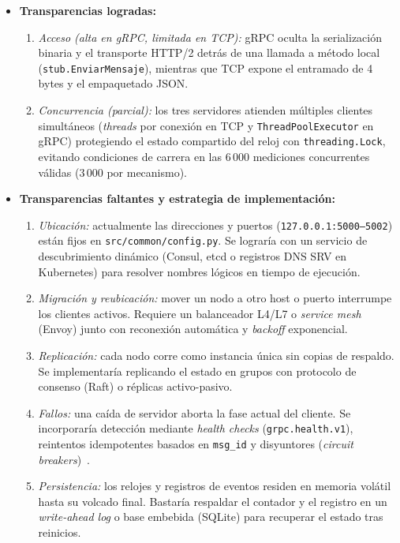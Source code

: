 \begin{itemize}
  \item \textbf{Transparencias logradas:}
    \begin{enumerate}
      \item \emph{Acceso (alta en gRPC, limitada en TCP):} gRPC oculta la serialización binaria y el transporte HTTP/2 detrás de una llamada a método local (\texttt{stub.EnviarMensaje}), mientras que TCP expone el entramado de 4 bytes y el empaquetado JSON.
      \item \emph{Concurrencia (parcial):} los tres servidores atienden múltiples clientes simultáneos (\emph{threads} por conexión en TCP y \texttt{ThreadPoolExecutor} en gRPC) protegiendo el estado compartido del reloj con \texttt{threading.Lock}, evitando condiciones de carrera en las 6\,000 mediciones concurrentes válidas (3\,000 por mecanismo).
    \end{enumerate}
  \item \textbf{Transparencias faltantes y estrategia de implementación:}
    \begin{enumerate}
      \item \emph{Ubicación:} actualmente las direcciones y puertos (\texttt{127.0.0.1:5000--5002}) están fijos en \texttt{src/common/config.py}. Se lograría con un servicio de descubrimiento dinámico (Consul, etcd o registros DNS SRV en Kubernetes) para resolver nombres lógicos en tiempo de ejecución.
      \item \emph{Migración y reubicación:} mover un nodo a otro host o puerto interrumpe los clientes activos. Requiere un balanceador L4/L7 o \emph{service mesh} (Envoy) junto con reconexión automática y \emph{backoff} exponencial.
      \item \emph{Replicación:} cada nodo corre como instancia única sin copias de respaldo. Se implementaría replicando el estado en grupos con protocolo de consenso (Raft) o réplicas activo-pasivo.
      \item \emph{Fallos:} una caída de servidor aborta la fase actual del cliente. Se incorporaría detección mediante \emph{health checks} (\texttt{grpc.health.v1}), reintentos idempotentes basados en \texttt{msg\_id} y disyuntores (\emph{circuit breakers})~\cite{mohammad2025resilient}.
      \item \emph{Persistencia:} los relojes y registros de eventos residen en memoria volátil hasta su volcado final. Bastaría respaldar el contador y el registro en un \emph{write-ahead log} o base embebida (SQLite) para recuperar el estado tras reinicios.
    \end{enumerate}
\end{itemize}
